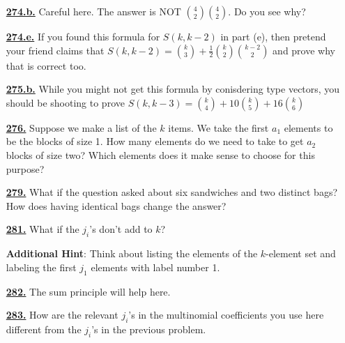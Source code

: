 \documentclass[10pt,]{book}
\theoremstyle{plain}
\theoremstyle{definition}
\theoremstyle{definition}
\theoremstyle{definition}
\numberwithin{equation}{chapter}
\begin{document}
\begin{itemize}[itemsep=1em]
\hypertarget{a-274.b}{}\item[\textbf{\hyperref[task-257]{274.b.}}]
\hypertarget{p-1407}{}%
Careful here.  The answer is NOT \(\binom{4}{2}\binom{4}{2}\).  Do you see why?%

\hypertarget{a-274.e}{}\item[\textbf{\hyperref[task-260]{274.e.}}]
\hypertarget{p-1411}{}%
If you found this formula for \(S(k,k-2)\) in part (e), then pretend your friend claims that \(S(k, k-2) = \binom{k}{3} + \frac{1}{2}\binom{k}{2}\binom{k-2}{2}\) and prove why that is correct too.%

\hypertarget{a-275.b}{}\item[\textbf{\hyperref[task-262]{275.b.}}]
\hypertarget{p-1415}{}%
While you might not get this formula by conisdering type vectors, you should be shooting to prove \(S(k, k-3) = \binom{k}{4} + 10 \binom{k}{5} + 16 \binom{k}{6}\)%

\hypertarget{a-276}{}\item[\textbf{\hyperref[partitionsgivenpartsize]{276.}}]
\hypertarget{p-1417}{}%
Suppose we make a list of the \(k\) items. We take the first \(a_1\) elements to be the blocks of size 1. How many elements do we need to take to get \(a_2\) blocks of size two? Which elements does it make sense to choose for this purpose?%

\hypertarget{a-279}{}\item[\textbf{\hyperref[caterer2]{279.}}]
\hypertarget{p-1424}{}%
What if the question asked about six sandwiches and two distinct bags? How does having identical bags change the answer?%

\hypertarget{a-281}{}\item[\textbf{\hyperref[activity-274]{281.}}]
\hypertarget{p-1431}{}%
What if the \(j_i\)'s don't add to \(k\)?%

\par\smallskip
\noindent\textbf{Additional Hint}: \hypertarget{p-1432}{}%
Think about listing the elements of the \(k\)-element set and labeling the first \(j_1\) elements with label number 1.%

\hypertarget{a-282}{}\item[\textbf{\hyperref[activity-275]{282.}}]
\hypertarget{p-1435}{}%
The sum principle will help here.%

\hypertarget{a-283}{}\item[\textbf{\hyperref[activity-276]{283.}}]
\hypertarget{p-1438}{}%
How are the relevant \(j_i\)'s in the multinomial coefficients you use here different from the \(j_i\)'s in the previous problem.%


\end{itemize}
\end{document}
